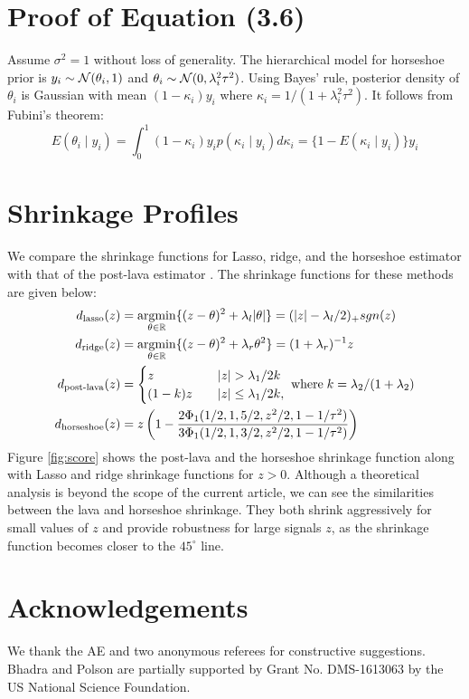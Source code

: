\documentclass[sts,preprint]{imsart}
\begin{document}
\begin{appendix}
\section{Proof of Equation (3.6)}\label{sec:proof}

Assume $\sigma^2 = 1$ without loss of generality. The hierarchical model for horseshoe prior is $y_i \sim {\cal N}(\theta_i,1)$ and $\theta_i \sim {\cal N}(0, \lambda_i^2 \tau^2)$. Using Bayes' rule, posterior density of $\theta_i$ is Gaussian with mean $(1-\kappa_i)y_i$ where $\kappa_i = 1 / (1 + \lambda_i^2 \tau^2)$. It follows from Fubini's theorem:
\[
E(\theta_i \mid y_i) = \int_0^1 (1-\kappa_i)y_i p(\kappa_i \mid y_i) d \kappa_i = \{1 - E(\kappa_i \mid y_i)\} y_i 
\]

\section{Shrinkage Profiles}\label{sec:shrink}
We compare the shrinkage functions for Lasso, ridge, and the horseshoe estimator with that of the post-lava estimator \citep{chernozhukov2017lava}. The shrinkage functions for these methods are given below:
\begin{align}
d_{\text{lasso}}(z) & = \argmin_{\theta \in \mathbb{R}} \{ (z-\theta)^2 + \lambda_l \abs{\theta} \} = (\abs{z} - \lambda_l/2)_{+} sgn(z) \\
d_{\text{ridge}}(z) & = \argmin_{\theta \in \mathbb{R}} \{ (z-\theta)^2 + \lambda_r \theta^2 \}= (1 + \lambda_r)^{-1} z \\
d_{\text{post-lava}}(z) & = \begin{cases} 
                                         z & \quad \abs{z} > \lambda_1/2k \\
                                         (1-k)z & \quad \abs{z} \le \lambda_1/2k,
                                        \end{cases}
\; \text{where} \; k = \lambda_2/ (1 + \lambda_2) \\
d_{\text{horseshoe}}(z) & = z \left( 1 - \frac{2 \Phi_1(1/2,1,5/2,z^2/2,1-1/\tau^2)}{3\Phi_1(1/2,1,3/2, z^2/2, 1 - 1/\tau^2)} \right) 
\end{align}
Figure \ref{fig:score} shows the post-lava and the horseshoe shrinkage function along with Lasso and ridge shrinkage functions for $z > 0$. Although a theoretical analysis is beyond the scope of the current article, we can see the similarities between the lava and horseshoe shrinkage. They both shrink aggressively for small values of $z$ and provide robustness for large signals $z$, as the shrinkage function becomes closer to the $45^\circ$ line.
\end{appendix}

\section*{Acknowledgements}
We thank the AE and two anonymous referees for constructive suggestions. Bhadra and Polson are partially supported by Grant No. DMS-1613063 by the US National Science Foundation.



\end{document}

